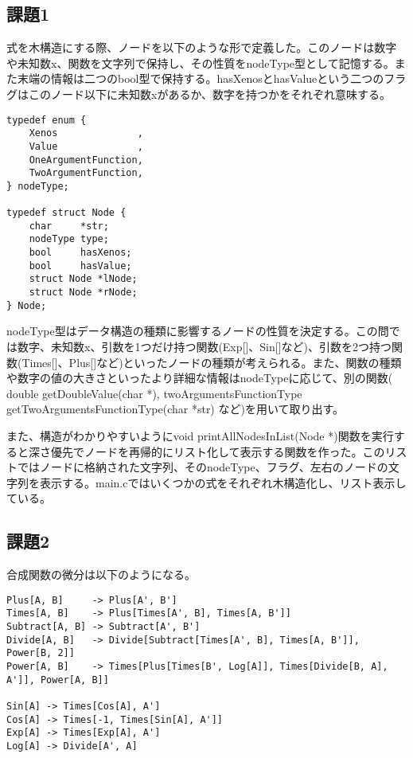 \documentclass[11pt, oneside]{jsarticle}   	%
\begin{document}
\subsection*{課題1}
    式を木構造にする際、ノードを以下のような形で定義した。このノードは数字や未知数x、関数を文字列で保持し、その性質をnodeType型として記憶する。また末端の情報は二つのbool型で保持する。hasXenosとhasValueという二つのフラグはこのノード以下に未知数xがあるか、数字を持つかをそれぞれ意味する。
\begin{lstlisting}[basicstyle=\ttfamily\footnotesize, frame=single]
typedef enum {
    Xenos              ,
    Value              ,
    OneArgumentFunction,
    TwoArgumentFunction,
} nodeType;

typedef struct Node {
    char     *str;
    nodeType type;
    bool     hasXenos;
    bool     hasValue;
    struct Node *lNode;
    struct Node *rNode;
} Node;
\end{lstlisting}
    nodeType型はデータ構造の種類に影響するノードの性質を決定する。この問では数字、未知数x、引数を1つだけ持つ関数(Exp[]、Sin[]など)、引数を2つ持つ関数(Times[]、Plus[]など)といったノードの種類が考えられる。また、関数の種類や数字の値の大きさといったより詳細な情報はnodeTypeに応じて、別の関数( double getDoubleValue(char *), twoArgumentsFunctionType getTwoArgumentsFunctionType(char *str) など)を用いて取り出す。

    また、構造がわかりやすいようにvoid printAllNodesInList(Node *)関数を実行すると深さ優先でノードを再帰的にリスト化して表示する関数を作った。このリストではノードに格納された文字列、そのnodeType、フラグ、左右のノードの文字列を表示する。main.cではいくつかの式をそれぞれ木構造化し、リスト表示している。

\subsection*{課題2}
    合成関数の微分は以下のようになる。
\begin{lstlisting}[basicstyle=\ttfamily\footnotesize]
Plus[A, B]     -> Plus[A', B']
Times[A, B]    -> Plus[Times[A', B], Times[A, B']]
Subtract[A, B] -> Subtract[A', B']
Divide[A, B]   -> Divide[Subtract[Times[A', B], Times[A, B']], Power[B, 2]]
Power[A, B]    -> Times[Plus[Times[B', Log[A]], Times[Divide[B, A], A']], Power[A, B]]

Sin[A] -> Times[Cos[A], A']
Cos[A] -> Times[-1, Times[Sin[A], A']]
Exp[A] -> Times[Exp[A], A']
Log[A] -> Divide[A', A]
\end{lstlisting}
\end{document}
